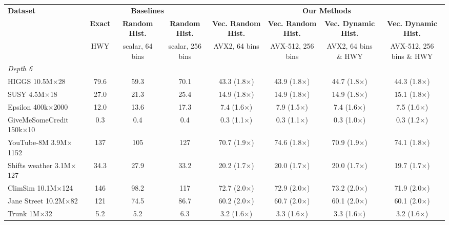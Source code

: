 \begin{table}[p]
    \centering
    \footnotesize
    \setlength{\tabcolsep}{2.5pt}
    \begin{tabular}{l|ccc|cccc}
        \hline
        \multirow{3}{*}{\textbf{Dataset}} & \multicolumn{3}{c|}{\textbf{Baselines}} & \multicolumn{4}{c}{\textbf{Our Methods}} \\
         & \textbf{Exact} & \textbf{Random Hist.} & \textbf{Random Hist.} & \textbf{Vec. Random Hist.} & \textbf{Vec. Random Hist.} & \textbf{Vec. Dynamic Hist.} & \textbf{Vec. Dynamic Hist.} \\
         & \scriptsize HWY & \scriptsize scalar, 64 bins & \scriptsize scalar, 256 bins & \scriptsize AVX2, 64 bins & \scriptsize AVX-512, 256 bins & \scriptsize AVX2, 64 bins \& HWY & \scriptsize AVX-512, 256 bins \& HWY \\
        \hline
        \multicolumn{8}{l}{\textit{Depth 6}} \\
        HIGGS 10.5M$\times$28 & 79.6 & 59.3 & 70.1 & 43.3 (1.8$\times$) & 43.9 (1.8$\times$) & 44.7 (1.8$\times$) & 44.3 (1.8$\times$) \\
        SUSY 4.5M$\times$18 & 27.0 & 21.3 & 25.4 & 14.9 (1.8$\times$) & 14.9 (1.8$\times$) & 14.9 (1.8$\times$) & 15.1 (1.8$\times$) \\
        Epsilon 400k$\times$2000 & 12.0 & 13.6 & 17.3 & 7.4 (1.6$\times$) & 7.9 (1.5$\times$) & 7.4 (1.6$\times$) & 7.5 (1.6$\times$) \\
        GiveMeSomeCredit 150k$\times$10 & 0.3 & 0.4 & 0.4 & 0.3 (1.1$\times$) & 0.3 (1.1$\times$) & 0.3 (1.0$\times$) & 0.3 (1.2$\times$) \\
        YouTube-8M 3.9M$\times$1152 & 137 & 105 & 127 & 70.7 (1.9$\times$) & 74.6 (1.8$\times$) & 70.9 (1.9$\times$) & 74.1 (1.8$\times$) \\
        Shifts weather 3.1M$\times$127 & 34.3 & 27.9 & 33.2 & 20.2 (1.7$\times$) & 20.0 (1.7$\times$) & 20.0 (1.7$\times$) & 19.7 (1.7$\times$) \\
        ClimSim 10.1M$\times$124 & 146 & 98.2 & 117 & 72.7 (2.0$\times$) & 72.9 (2.0$\times$) & 73.2 (2.0$\times$) & 71.9 (2.0$\times$) \\
        Jane Street 10.2M$\times$82 & 121 & 74.5 & 86.7 & 60.2 (2.0$\times$) & 60.7 (2.0$\times$) & 60.1 (2.0$\times$) & 60.1 (2.0$\times$) \\
        Trunk 1M$\times$32 & 5.2 & 5.2 & 6.3 & 3.2 (1.6$\times$) & 3.3 (1.6$\times$) & 3.3 (1.6$\times$) & 3.2 (1.6$\times$) \\

\end{tabular}
\end{table}
